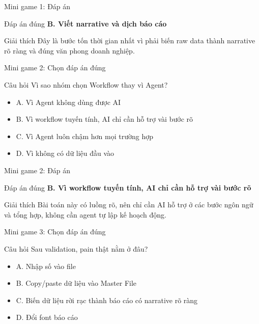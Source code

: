 \documentclass[aspectratio=169,11pt]{beamer}
\begin{document}
\begin{frame}{Mini game 1: Đáp án}
  \begin{block}{Đáp án đúng}
    \textbf{B. Viết narrative và dịch báo cáo}
  \end{block}

  \begin{block}{Giải thích}
    Đây là bước tốn thời gian nhất vì phải biến raw data thành narrative rõ ràng và đúng văn phong doanh nghiệp.
  \end{block}
\end{frame}

\begin{frame}{Mini game 2: Chọn đáp án đúng}
  \begin{block}{Câu hỏi}
    Vì sao nhóm chọn Workflow thay vì Agent?
  \end{block}

  \begin{itemize}
    \item A. Vì Agent không dùng được AI
    \item B. Vì workflow tuyến tính, AI chỉ cần hỗ trợ vài bước rõ
    \item C. Vì Agent luôn chậm hơn mọi trường hợp
    \item D. Vì không có dữ liệu đầu vào
  \end{itemize}
\end{frame}

\begin{frame}{Mini game 2: Đáp án}
  \begin{block}{Đáp án đúng}
    \textbf{B. Vì workflow tuyến tính, AI chỉ cần hỗ trợ vài bước rõ}
  \end{block}

  \begin{block}{Giải thích}
    Bài toán này có luồng rõ, nên chỉ cần AI hỗ trợ ở các bước ngôn ngữ và tổng hợp, không cần agent tự lập kế hoạch động.
  \end{block}
\end{frame}

\begin{frame}{Mini game 3: Chọn đáp án đúng}
  \begin{block}{Câu hỏi}
    Sau validation, pain thật nằm ở đâu?
  \end{block}

  \begin{itemize}
    \item A. Nhập số vào file
    \item B. Copy/paste dữ liệu vào Master File
    \item C. Biến dữ liệu rời rạc thành báo cáo có narrative rõ ràng
    \item D. Đổi font báo cáo
  \end{itemize}
\end{frame}
\end{document}
